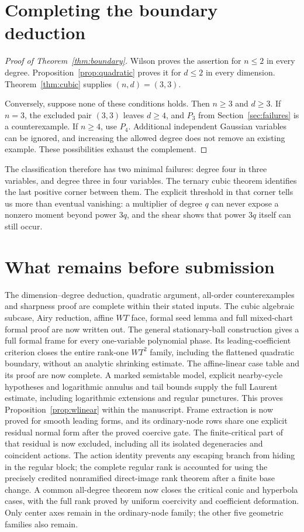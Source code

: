 \documentclass[11pt]{article}
\theoremstyle{definition}\newtheorem{definition}[theorem]{Definition}
\theoremstyle{remark}\newtheorem{remark}[theorem]{Remark}
\begin{document}
\section{Completing the boundary deduction}
\begin{proof}[Proof of Theorem~\ref{thm:boundary}]
Wilson proves the assertion for $n\leq2$ in every degree.
Proposition~\ref{prop:quadratic} proves it for $d\leq2$ in every
dimension. Theorem~\ref{thm:cubic} supplies $(n,d)=(3,3)$.

Conversely, suppose none of these conditions holds. Then $n\geq3$
and $d\geq3$. If $n=3$, the excluded pair $(3,3)$ leaves $d\geq4$,
and $P_3$ from Section~\ref{sec:failures} is a counterexample.
If $n\geq4$, use $P_4$. Additional independent Gaussian variables can
be ignored, and increasing the allowed degree does not remove an
existing example. These possibilities exhaust the complement.
\end{proof}

The classification therefore has two minimal failures: degree four
in three variables, and degree three in four variables. The ternary
cubic theorem identifies the last positive corner between them.
The explicit threshold in that corner tells us more than eventual
vanishing: a multiplier of degree $q$ can never expose a nonzero
moment beyond power $3q$, and the shear shows that power $3q$ itself
can still occur.

\section*{What remains before submission}
The dimension--degree deduction, quadratic argument, all-order
counterexamples and sharpness proof are complete within their stated
inputs. The cubic algebraic subcase, Airy reduction, affine $WT$ face,
formal seed lemma and full mixed-chart formal proof are now written out.
The general stationary-ball construction gives a full formal frame
for every one-variable polynomial phase. Its leading-coefficient
criterion closes the entire rank-one $WT^2$ family, including the
flattened quadratic boundary, without an analytic shrinking estimate.
The affine-linear case table and its proof are now complete.
A marked semistable model, explicit nearby-cycle hypotheses and
logarithmic annulus and tail bounds supply the full Laurent estimate,
including logarithmic extensions and regular punctures. This proves
Proposition~\ref{prop:wlinear} within the manuscript. Frame extraction
is now proved for smooth leading forms, and its ordinary-node rows
share one explicit residual normal form after the proved coercive gate.
The finite-critical part of that residual is now excluded, including all
its isolated degeneracies and coincident actions. The action identity
prevents any escaping branch from hiding in the regular block; the
complete regular rank is accounted for using the precisely credited
nonramified direct-image rank theorem after a finite base change.
A common all-degree theorem now closes the critical conic and
hyperbola cases, with the full rank proved by uniform coercivity
and coefficient deformation. Only center axes remain in the
ordinary-node family; the other five geometric families also remain.
\end{document}
